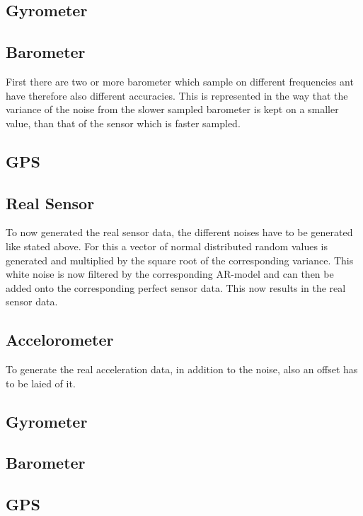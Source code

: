 \subsection{Gyrometer}

\subsection{Barometer}
First there are two or more barometer which sample on different frequencies ant have therefore also different accuracies.
This is represented in the way that the variance of the noise from the slower sampled barometer is kept on a smaller value,
than that of the sensor which is faster sampled.


\subsection{GPS}

\subsection{Real Sensor}
To now generated the real sensor data, the different noises have to be generated like stated above.
For this a vector of normal distributed random values is generated and multiplied by the square root of the corresponding variance.
This white noise is now filtered by the corresponding AR-model and can then be added onto the corresponding perfect sensor data.
This now results in the real sensor data.

\subsection{Accelorometer}
To generate the real acceleration data, in addition to the noise, also an offset has to be laied of it.


\subsection{Gyrometer}


\subsection{Barometer}


\subsection{GPS}




